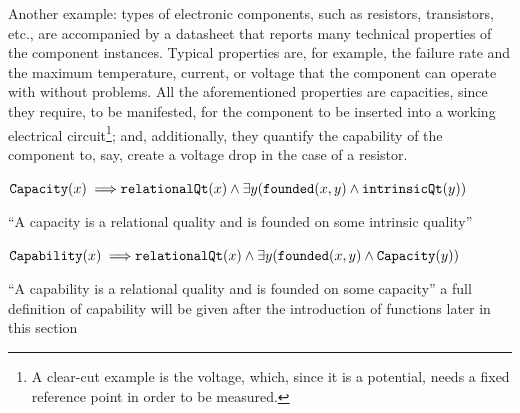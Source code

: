 \documentclass[sw]{iosart2x}
\newcommand{\bflist}{\begin{list}{}{\setlength{\topsep}{2mm}\setlength{\partopsep}{0mm}\setlength{\parsep}{0mm}\setlength{\leftmargin}{9mm}\setlength{\labelwidth}{8mm}}}
\newcommand{\eflist}{\end{list}}
\newcommand{\AxLabel}{\textrm{a}}
\newcounter{cntax}
\newcommand{\myax}[1]{\refstepcounter{cntax}\begin{small}{\bf \AxLabel\thecntax\label{ax:#1}}\end{small}}
\newcommand{\mytext}[1]{``#1''}
\newcommand{\generalStyle}[1]{\texttt{#1}}
\newcommand{\biRel}[3]{\generalStyle{#1}(#2,#3)}
\newcommand{\uniRel}[2]{\generalStyle{#1}(#2)}
\newcommand{\myfi}{\hspace{0.9mm} \Longrightarrow}
\newcommand{\Capability}[1]{\uniRel{Capability}{#1}}
\newcommand{\Capacity}[1]{\uniRel{Capacity}{#1}}
\newcommand{\RelationalQuality}[1]{\uniRel{relationalQt}{#1}}
\newcommand{\IntrinsicQuality}[1]{\uniRel{intrinsicQt}{#1}}
\newcommand{\founded}[2]{\biRel{\foundedTerm{passive}}{#1}{#2}}
\newcommand{\foundedTerm}[1]{%
  \ifthenelse{\equal{#1}{passive}}{founded}{%
    \ifthenelse{\equal{#1}{verb}}{found}{%
      \ifthenelse{\equal{#1}{gerund}}{founding}{%
        ERROR!%
      }%
    }%
  }%
}
\begin{document}
Another example: types of electronic components, such as resistors, transistors, etc., are accompanied by a datasheet that reports many technical properties of the component instances. 
Typical properties are, for example, the failure rate and the maximum temperature, current, or voltage that the component can operate with without problems. 
All the aforementioned properties are capacities, since they require, to be manifested, for the component to be inserted into a working electrical circuit\footnote{A clear-cut example is the voltage, which, since it is a potential, needs a fixed reference point in order to be measured.}; and, additionally, they quantify the capability of the component to, say, create a voltage drop in the case of a resistor. 
\bflist
\item[\myax{capacPartialDef}] $ \Capacity{x} \myfi \RelationalQuality{x} \land \exists y(\founded{x}{y} \land \IntrinsicQuality{y}) $  %
\item[] \mytext{A capacity is a relational quality and is founded on some intrinsic quality}
\item[\myax{capabPartialDef}] $ \Capability{x} \myfi \RelationalQuality{x} \land  \exists y (\founded{x}{y} \land \Capacity{y}) $
\item[] \mytext{A capability is a relational quality and is founded on some capacity} a full definition of capability will be given after the introduction of functions later in this section
\eflist
\end{document}
